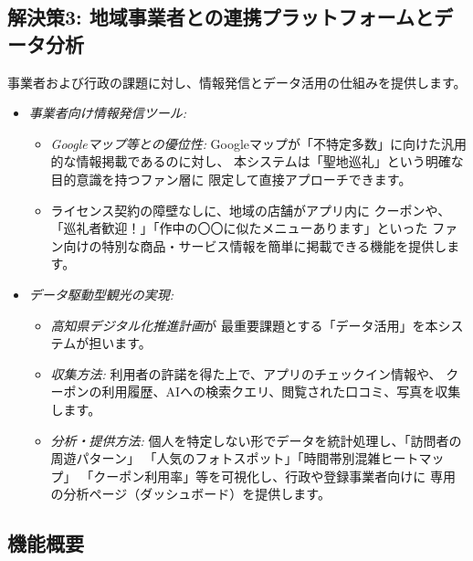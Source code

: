 \documentclass{docs}
\begin{document}
\subsection{解決策3: 地域事業者との連携プラットフォームとデータ分析}
事業者および行政の課題に対し、情報発信とデータ活用の仕組みを提供します。
\begin{itemize}
	\item \emph{事業者向け情報発信ツール:}
	\begin{itemize}
		\item \emph{Googleマップ等との優位性:}
		Googleマップが「不特定多数」に向けた汎用的な情報掲載であるのに対し、
		本システムは「聖地巡礼」という明確な目的意識を持つファン層に
		限定して直接アプローチできます。
		\item ライセンス契約\cite{nri2024}の障壁なしに、地域の店舗がアプリ内に
		クーポンや、「巡礼者歓迎！」「作中の〇〇に似たメニューあります」といった
		ファン向けの特別な商品・サービス情報を簡単に掲載できる機能を提供します。
	\end{itemize}
	\item \emph{データ駆動型観光の実現:}
	\begin{itemize}
		\item \emph{高知県デジタル化推進計画\cite{kochi_dx_plan}}が
		最重要課題とする「データ活用」を本システムが担います。
		\item \emph{収集方法:}
		利用者の許諾を得た上で、アプリのチェックイン情報や、
		クーポンの利用履歴、AIへの検索クエリ、閲覧された口コミ、写真を収集します。
		\item \emph{分析・提供方法:}
		個人を特定しない形でデータを統計処理し、「訪問者の周遊パターン」
		「人気のフォトスポット」「時間帯別混雑ヒートマップ」
		「クーポン利用率」等を可視化し、行政や登録事業者向けに
		専用の分析ページ（ダッシュボード）を提供します。
	\end{itemize}
\end{itemize}

\subsection{機能概要}
\end{document}
